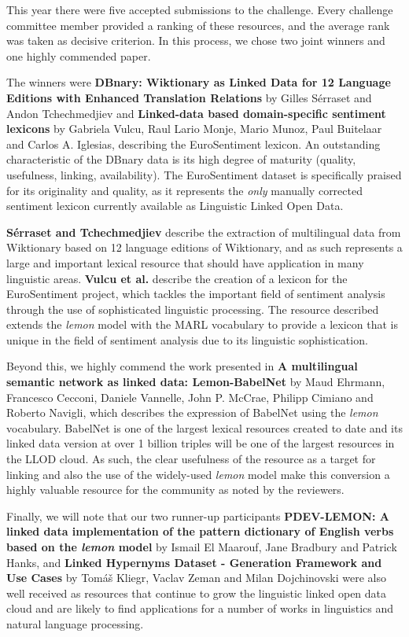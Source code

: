 \noindent	
This year there were five accepted submissions to the challenge. 
Every challenge committee member provided a ranking of these resources, and the average rank was taken as decisive criterion.
In this process, we chose two joint winners and one highly commended paper. 

The winners 
were \textbf{DBnary: Wiktionary as Linked Data for 12 Language Editions with Enhanced 
Translation Relations} by Gilles Sérraset and Andon Tchechmedjiev and \textbf{Linked-data 
based domain-specific sentiment lexicons} by Gabriela Vulcu, Raul Lario Monje, 
Mario Munoz, Paul Buitelaar and Carlos A. Iglesias, describing the EuroSentiment 
lexicon. 
An outstanding characteristic of the DBnary data is its high degree of maturity (quality, usefulness, linking, availability). 
The EuroSentiment dataset is specifically praised for its originality and quality, as it represents the \emph{only} manually corrected sentiment lexicon currently available as Linguistic Linked Open Data.

\textbf{Sérraset and Tchechmedjiev} describe the extraction of multilingual data from Wiktionary 
based on 12 language editions of Wiktionary, and as such represents a large and 
important lexical resource that should have application in many linguistic areas. 
\textbf{Vulcu et al.} describe the creation of a lexicon for the EuroSentiment project, which 
tackles the important field of sentiment analysis through the use of sophisticated 
linguistic processing. The resource described extends the \textit{lemon} model 
with the MARL vocabulary to provide a lexicon that is unique in the field of sentiment 
analysis due to its linguistic sophistication. 

Beyond this, we highly commend the work presented in \textbf{A multilingual semantic network as linked data: Lemon-BabelNet} by
Maud Ehrmann, Francesco Cecconi, Daniele Vannelle, John P. McCrae, Philipp Cimiano 
and Roberto Navigli, which describes the expression of BabelNet using the \textit{lemon} 
vocabulary. BabelNet is one of the largest lexical resources created to date and 
its linked data version at over 1 billion triples will be one of the largest resources 
in the LLOD cloud. As such, the clear usefulness of the resource as a target for 
linking and also the use of the widely-used \textit{lemon} model make this conversion 
a highly valuable resource for the community as noted by the reviewers. 

Finally, 
we will note that our two runner-up participants \textbf{PDEV-LEMON: A linked data implementation 
of the pattern dictionary of English verbs based on the \textit{lemon} model} 
by  Ismail El Maarouf, Jane Bradbury and Patrick Hanks, and \textbf{Linked Hypernyms Dataset - Generation Framework 
and Use Cases} by Tomáš Kliegr, Vaclav Zeman and Milan Dojchinovski were also well received as resources that 
continue to grow the linguistic linked open data cloud and are likely to find applications 
for a number of works in linguistics and natural language processing.

